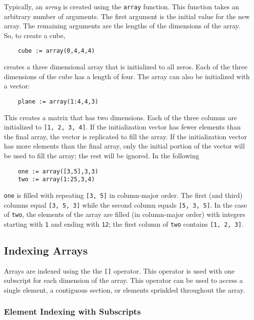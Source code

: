 Typically, 
an {\em array} is created using the {\tt array} 
function. This function takes an arbitrary number of arguments.
The first argument is the initial value for the new array. The remaining
arguments are the lengths of the dimensions of the array. So, to create
a cube,
\begin{verbatim}
    cube := array(0,4,4,4)
\end{verbatim}
creates a three dimensional array that is initialized to all zeros. Each of
the three dimensions of the cube has a length of four. The array can also be
initialized with a vector:
\begin{verbatim}
    plane := array(1:4,4,3)
\end{verbatim}
This creates a matrix that has two dimensions. Each of the three columns are 
initialized to {\tt [1, 2, 3, 4]}. If the initialization vector has fewer
elements than the final array, the vector is replicated to fill the array.
If the initialization vector has more elements than the final array, only 
the initial portion of the vector will be used to fill the array; the rest
will be ignored. In the following
\begin{verbatim}
    one := array([3,5],3,3)
    two := array(1:25,3,4)
\end{verbatim}
{\tt one} is filled with repeating {\tt [3, 5]} in column-major order. The
first (and third) columns equal {\tt [3, 5, 3]} while the second
column equals
{\tt [5, 3, 5]}. In the case of {\tt two}, the elements of the array are
filled (in column-major order) with integers starting with {\tt 1} and 
ending with {\tt 12}; the first column of {\tt two} contains {\tt [1, 2, 3]}.

\subsection{Indexing Arrays}
\label{indexing-arrays}

Arrays 
are indexed using the the {\tt []} operator. This operator is used with one
subscript for each dimension of the array. This operator can be used to 
access a single element, a contiguous section, or elements sprinkled throughout
the array.

\subsubsection{Element Indexing with Subscripts}
\label{indexing-array-elements-subscript}

